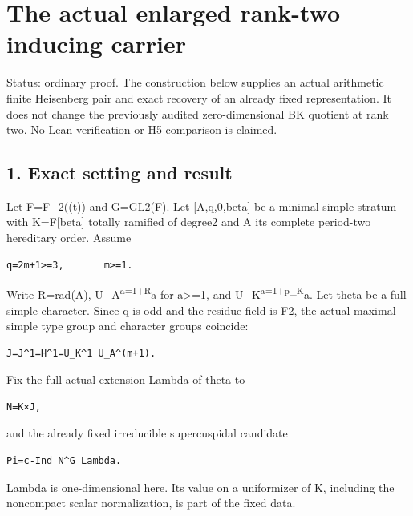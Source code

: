 \clearpage
\section{The actual enlarged rank-two inducing carrier}\label{app:rank2}

Status: ordinary proof. The construction below supplies an actual
arithmetic finite Heisenberg pair and exact recovery of an already fixed
representation. It does not change the previously audited
zero-dimensional BK quotient at rank two. No Lean verification or H5
comparison is claimed.

\hypertarget{rank2-exact-setting-and-result}{%
\subsection{1. Exact setting and
result}\label{rank2-exact-setting-and-result}}

Let F=F\_2((t)) and G=GL2(F). Let {[}A,q,0,beta{]} be a minimal simple
stratum with K=F{[}beta{]} totally ramified of degree2 and A its
complete period-two hereditary order. Assume

\begin{Verbatim}[fontsize=\small,breaklines=true,breakanywhere=true]
q=2m+1>=3,       m>=1.
\end{Verbatim}

Write R=rad(A), U\_A\textsuperscript{a=1+R}a for a\textgreater=1, and
U\_K\textsuperscript{a=1+p\_K}a. Let theta be a full simple character.
Since q is odd and the residue field is F2, the actual maximal simple
type group and character groups coincide:

\begin{Verbatim}[fontsize=\small,breaklines=true,breakanywhere=true]
J=J^1=H^1=U_K^1 U_A^(m+1).
\end{Verbatim}

Fix the full actual extension Lambda of theta to

\begin{Verbatim}[fontsize=\small,breaklines=true,breakanywhere=true]
N=K×J,
\end{Verbatim}

and the already fixed irreducible supercuspidal candidate

\begin{Verbatim}[fontsize=\small,breaklines=true,breakanywhere=true]
Pi=c-Ind_N^G Lambda.
\end{Verbatim}

Lambda is one-dimensional here. Its value on a uniformizer of K,
including the noncompact scalar normalization, is part of the fixed
data.


